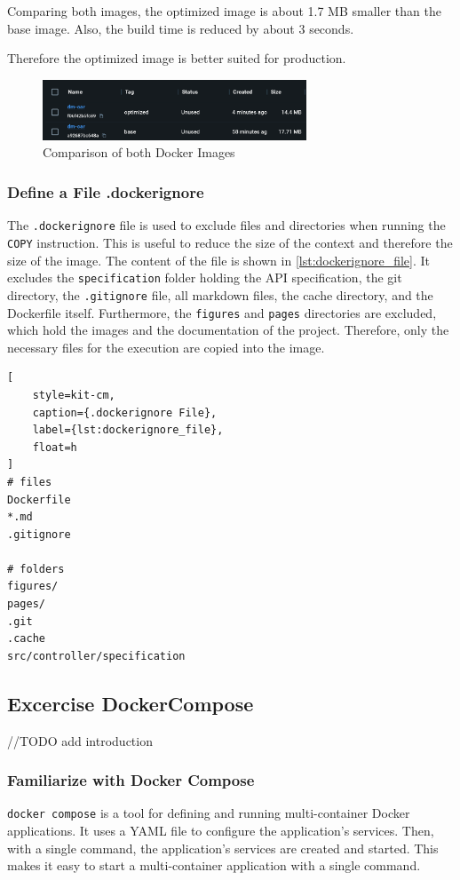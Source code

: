 Comparing both images, the optimized image is about 1.7 MB smaller than the base image.
Also, the build time is reduced by about 3 seconds.

Therefore the optimized image is better suited for production.

\begin{figure}
    \centering
    \includegraphics[width=0.7\textwidth]{figures/microservices/dmCar/ms_dmCar_optimizedComparison.png}
    \caption{Comparison of both Docker Images}
    \label{fig:docker_image_comparison}
\end{figure}

\subsubsection*{Define a File .dockerignore}
The \texttt{.dockerignore} file is used to exclude files and directories when running the \texttt{COPY} instruction.
This is useful to reduce the size of the context and therefore the size of the image.
The content of the file is shown in \autoref*{lst:dockerignore_file}.
It excludes the \texttt{specification} folder holding the API specification, the git directory, the \texttt{.gitignore} file, all markdown files, the cache directory, and the Dockerfile itself.
Furthermore, the \texttt{figures} and \texttt{pages} directories are excluded, which hold the images and the documentation of the project.
Therefore, only the necessary files for the execution are copied into the image.

\begin{lstlisting}[
    style=kit-cm,
    caption={.dockerignore File},
    label={lst:dockerignore_file},
    float=h
]
# files
Dockerfile
*.md
.gitignore

# folders
figures/
pages/
.git
.cache
src/controller/specification
\end{lstlisting}

\subsection{Excercise DockerCompose}
//TODO add introduction
\subsubsection*{Familiarize with Docker Compose}
\texttt{docker compose} is a tool for defining and running multi-container Docker applications.
It uses a YAML file to configure the application's services.
Then, with a single command, the application's services are created and started.
This makes it easy to start a multi-container application with a single command.

